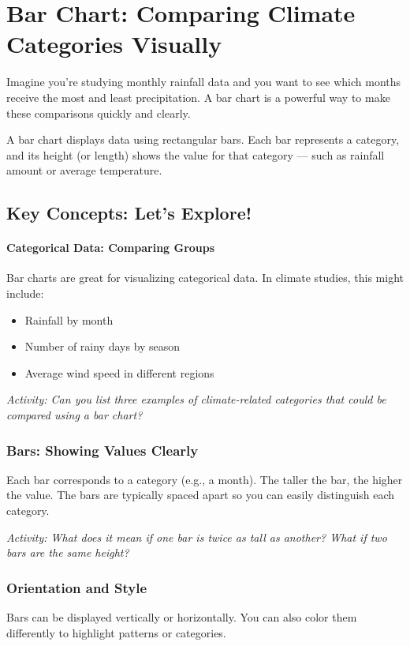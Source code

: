 \section{Bar Chart: Comparing Climate Categories Visually}

Imagine you’re studying monthly rainfall data and you want to see which months receive the most and least precipitation. A bar chart is a powerful way to make these comparisons quickly and clearly.

A bar chart displays data using rectangular bars. Each bar represents a category, and its height (or length) shows the value for that category — such as rainfall amount or average temperature.

\subsection*{Key Concepts: Let’s Explore!}

\paragraph{Categorical Data: Comparing Groups} Bar charts are great for visualizing categorical data. In climate studies, this might include:
\begin{itemize}
  \item Rainfall by month
  \item Number of rainy days by season
  \item Average wind speed in different regions
\end{itemize}
\textit{Activity: Can you list three examples of climate-related categories that could be compared using a bar chart?}

\subsubsection*{Bars: Showing Values Clearly} Each bar corresponds to a category (e.g., a month). The taller the bar, the higher the value. The bars are typically spaced apart so you can easily distinguish each category.

\textit{Activity: What does it mean if one bar is twice as tall as another? What if two bars are the same height?}

\subsubsection*{Orientation and Style} Bars can be displayed vertically or horizontally. You can also color them differently to highlight patterns or categories.

